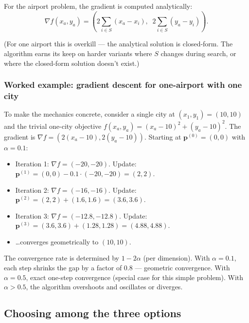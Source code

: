 \documentclass[11pt, a4paper]{article}
\begin{document}
For the airport problem, the gradient is computed analytically:
\[
\nabla f(x_a, y_a) = \left(2 \sum_{i \in S} (x_a - x_i), \;\; 2 \sum_{i \in S} (y_a - y_i)\right).
\]

(For one airport this is overkill — the analytical solution is closed-form. The algorithm earns its keep on harder variants where $S$ changes during search, or where the closed-form solution doesn't exist.)

\subsubsection*{Worked example: gradient descent for one-airport with one city}

To make the mechanics concrete, consider a single city at $(x_1, y_1) = (10, 10)$ and the trivial one-city objective $f(x_a, y_a) = (x_a - 10)^2 + (y_a - 10)^2$. The gradient is $\nabla f = (2(x_a - 10), 2(y_a - 10))$. Starting at $\mathbf{p}^{(0)} = (0, 0)$ with $\alpha = 0.1$:

\begin{itemize}
  \item Iteration 1: $\nabla f = (-20, -20)$. Update: $\mathbf{p}^{(1)} = (0, 0) - 0.1 \cdot (-20, -20) = (2, 2)$.
  \item Iteration 2: $\nabla f = (-16, -16)$. Update: $\mathbf{p}^{(2)} = (2, 2) + (1.6, 1.6) = (3.6, 3.6)$.
  \item Iteration 3: $\nabla f = (-12.8, -12.8)$. Update: $\mathbf{p}^{(3)} = (3.6, 3.6) + (1.28, 1.28) = (4.88, 4.88)$.
  \item \dots converges geometrically to $(10, 10)$.
\end{itemize}

The convergence rate is determined by $1 - 2\alpha$ (per dimension). With $\alpha = 0.1$, each step shrinks the gap by a factor of $0.8$ — geometric convergence. With $\alpha = 0.5$, exact one-step convergence (special case for this simple problem). With $\alpha > 0.5$, the algorithm overshoots and oscillates or diverges.

\subsection{Choosing among the three options}
\end{document}
